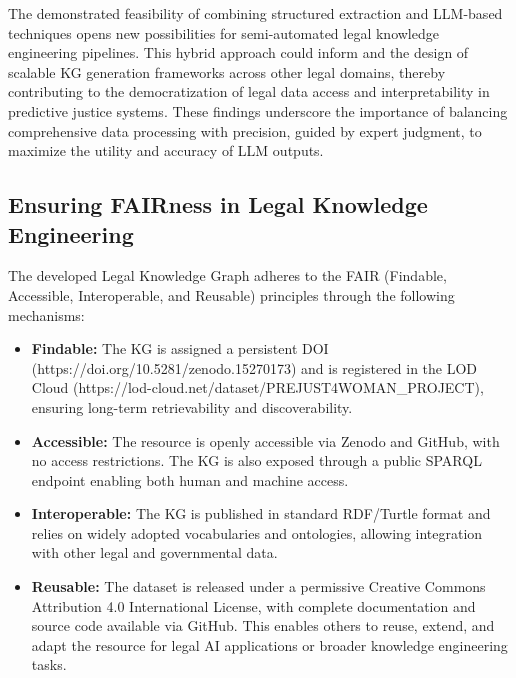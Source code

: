\documentclass[runningheads]{llncs}
\begin{document}
The demonstrated feasibility of combining structured extraction and LLM-based techniques opens new possibilities for semi-automated legal knowledge engineering pipelines. This hybrid approach could inform and the design of scalable KG generation frameworks across other legal domains, thereby contributing to the democratization of legal data access and interpretability in predictive justice systems. These findings underscore the importance of balancing comprehensive data processing with precision, guided by expert judgment, to maximize the utility and accuracy of LLM outputs. 

\subsection{Ensuring FAIRness in Legal Knowledge Engineering}
The developed Legal Knowledge Graph adheres to the FAIR (Findable, Accessible, Interoperable, and Reusable) principles through the following mechanisms:
\begin{itemize}
\item \textbf{Findable:} The KG is assigned a persistent DOI (https://doi.org/10.5281/zenodo.15270173) and is registered in the LOD Cloud (https://lod-cloud.net/dataset/PREJUST4WOMAN\_PROJECT), ensuring long-term retrievability and discoverability.
\item \textbf{Accessible:} The resource is openly accessible via Zenodo and GitHub, with no access restrictions. The KG is also exposed through a public SPARQL endpoint enabling both human and machine access.
\item \textbf{Interoperable:} The KG is published in standard RDF/Turtle format and relies on widely adopted vocabularies and ontologies, allowing integration with other legal and governmental data.
\item \textbf{Reusable:} The dataset is released under a permissive Creative Commons Attribution 4.0 International License, with complete documentation and source code available via GitHub. This enables others to reuse, extend, and adapt the resource for legal AI applications or broader knowledge engineering tasks.
\end{itemize}
\end{document}
